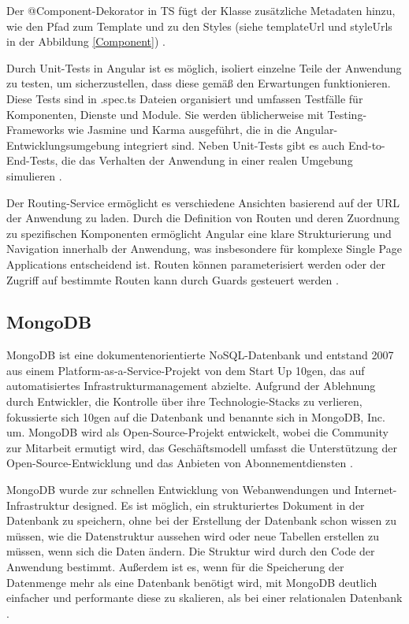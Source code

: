 Der @Component-Dekorator in TS fügt der Klasse zusätzliche Metadaten hinzu, wie den Pfad zum Template und zu den Styles (siehe templateUrl und styleUrls in der Abbildung \ref{Component}) \cite{angular_arch}.

Durch Unit-Tests in Angular ist es möglich, isoliert einzelne Teile der Anwendung zu testen, um sicherzustellen, dass diese gemäß den Erwartungen funktionieren. 
Diese Tests sind in .spec.ts Dateien organisiert und umfassen Testfälle für Komponenten, Dienste und Module. 
Sie werden üblicherweise mit Testing-Frameworks wie Jasmine und Karma ausgeführt, die in die Angular-Entwicklungsumgebung integriert sind. 
Neben Unit-Tests gibt es auch End-to-End-Tests, die das Verhalten der Anwendung in einer realen Umgebung simulieren \cite[S.340 ff.]{angular_testing}.

Der Routing-Service ermöglicht es verschiedene Ansichten basierend auf der URL der Anwendung zu laden. 
Durch die Definition von Routen und deren Zuordnung zu spezifischen Komponenten ermöglicht Angular eine klare Strukturierung und Navigation innerhalb der Anwendung, was insbesondere für komplexe Single Page Applications entscheidend ist. 
Routen können parameterisiert werden oder der Zugriff auf bestimmte Routen kann durch Guards gesteuert werden \cite{angular_routes}.

\subsection{MongoDB}
MongoDB ist eine dokumentenorientierte NoSQL-Datenbank und entstand 2007 aus einem Platform-as-a-Service-Projekt von dem Start Up 10gen, das auf automatisiertes Infrastrukturmanagement abzielte. 
Aufgrund der Ablehnung durch Entwickler, die Kontrolle über ihre Technologie-Stacks zu verlieren, fokussierte sich 10gen auf die Datenbank und benannte sich in MongoDB, Inc. um. 
MongoDB wird als Open-Source-Projekt entwickelt, wobei die Community zur Mitarbeit ermutigt wird, das Geschäftsmodell umfasst die Unterstützung der Open-Source-Entwicklung und das Anbieten von Abonnementdiensten \cite[S.5 f.]{Banker2016MongoDB}.

MongoDB wurde zur schnellen Entwicklung von Webanwendungen und Internet-Infrastruktur designed. 
Es ist möglich, ein strukturiertes Dokument in der Datenbank zu speichern, ohne bei der Erstellung der Datenbank schon wissen zu müssen, wie die Datenstruktur aussehen wird oder neue Tabellen erstellen zu müssen, wenn sich die Daten ändern. 
Die Struktur wird durch den Code der Anwendung bestimmt. Außerdem ist es, wenn für die Speicherung der Datenmenge mehr als eine Datenbank benötigt wird, mit MongoDB deutlich einfacher und performante diese zu skalieren, als bei einer relationalen Datenbank \cite[S.4 ff.]{Banker2016MongoDB}. 

